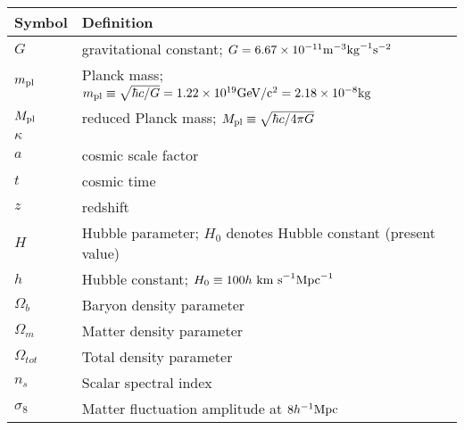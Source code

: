 
\begin{tabular}{ll}
\hline\hline
Symbol & Definition \\
\hline
$G$ & gravitational constant; $G=6.67\times10^{-11}\rm{m}^{-3}\rm{kg}^{-1}\rm{s}^{-2}$ \\
$m_{\text{\scriptsize pl}}$ & Planck mass; $m_{\text{\scriptsize pl}}\equiv\sqrt{\hbar c/G}=1.22\times10^{19}\rm{GeV}/c^2=2.18\times10^{-8}\rm{kg}$\\
$M_{\text{\scriptsize pl}}$ & reduced Planck mass; $M_{\text{\scriptsize pl}}\equiv\sqrt{\hbar c/4\pi G}$\\
$\kappa$ & \\
$a$ & cosmic scale factor \\
$t$ & cosmic time \\
$z$ & redshift \\
$H$ & Hubble parameter; $H_0$ denotes Hubble constant (present value) \\
$h$ & Hubble constant; $H_0\equiv100 h \rm{\ km\ s}^{-1}\rm{Mpc}^{-1}$ \\

$\Omega_b$ & Baryon density parameter \\
$\Omega_m$ & Matter density parameter \\
$\Omega_{tot}$ & Total density parameter \\
$n_s$ & Scalar spectral index \\
$\sigma_8$ & Matter fluctuation amplitude at $8h^{-1}\text{Mpc}$ \\
\hline


\hline\hline
\end{tabular}